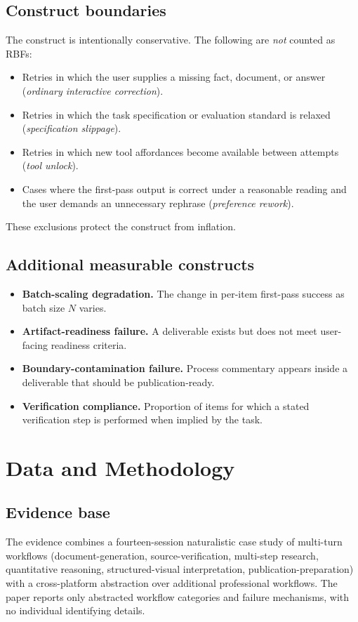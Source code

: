 \documentclass[11pt]{article}
\begin{document}
\subsection{Construct boundaries}
The construct is intentionally conservative. The following are \emph{not} counted as RBFs:
\begin{itemize}[leftmargin=*]
  \item Retries in which the user supplies a missing fact, document, or answer (\emph{ordinary interactive correction}).
  \item Retries in which the task specification or evaluation standard is relaxed (\emph{specification slippage}).
  \item Retries in which new tool affordances become available between attempts (\emph{tool unlock}).
  \item Cases where the first-pass output is correct under a reasonable reading and the user demands an unnecessary rephrase (\emph{preference rework}).
\end{itemize}
These exclusions protect the construct from inflation.

\subsection{Additional measurable constructs}
\begin{itemize}[leftmargin=*]
  \item \textbf{Batch-scaling degradation.} The change in per-item first-pass success as batch size $N$ varies.
  \item \textbf{Artifact-readiness failure.} A deliverable exists but does not meet user-facing readiness criteria.
  \item \textbf{Boundary-contamination failure.} Process commentary appears inside a deliverable that should be publication-ready.
  \item \textbf{Verification compliance.} Proportion of items for which a stated verification step is performed when implied by the task.
\end{itemize}

\section{Data and Methodology}
\label{sec:method}

\subsection{Evidence base}
The evidence combines a fourteen-session naturalistic case study of multi-turn workflows (document-generation, source-verification, multi-step research, quantitative reasoning, structured-visual interpretation, publication-preparation) with a cross-platform abstraction over additional professional workflows. The paper reports only abstracted workflow categories and failure mechanisms, with no individual identifying details.
\end{document}
